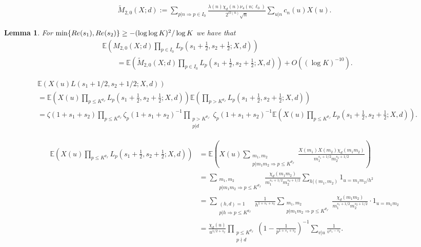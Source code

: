 \documentclass[10pt,a4paper]{amsart}
\newtheorem{lemma}{Lemma}
\renewcommand{\Re}{\textnormal{Re}}
\begin{document}
\begin{align}\label{modified-zero}
\widetilde M_{2,0}(X;d):=\sum_{p|n\Rightarrow p\in I_0}\frac{\lambda(n)\chi_d(n)\nu_4(n;\ell_0)}{2^{\Omega(n)}\sqrt n}\sum_{u|n}c_n(u)X(u).
\end{align}

\begin{lemma}\label{small-primes}
For $\min\{\Re(s_1),\Re(s_2)\}\geq -(\log\log K)^2/\log K$ we have that 
\begin{align*}
&\mathbb E\left(M_{2,0}(X;d)\prod_{p\in I_0}L_p\left(s_1+\frac12,s_2+\frac12;X,d\right)\right)\\
&\qquad=\mathbb E\left(\widetilde M_{2,0}(X;d)\prod_{p\in I_0}L_p\left(s_1+\frac12,s_2+\frac12;X,d\right)\right)+O\left((\log K)^{-10}\right).
\end{align*}
\end{lemma}

\begin{align}\label{twisted-exp}
&\mathbb E\left(X(u)L(s_1+1/2,s_2+1/2;X,d)\right) \nonumber\\
&=\mathbb E\left(X(u)\prod_{p\leq K^{\theta_J}}L_p\left(s_1+\frac12,s_2+\frac12;X,d\right)\right)\mathbb E\left(\prod_{p>K^{\theta_J}}L_p\left(s_1+\frac12,s_2+\frac12;X,d\right)\right)\nonumber\\
&=\zeta(1+s_1+s_2)\prod_{p\leq K^{\theta_J}}\zeta_p(1+s_1+s_2)^{-1}\prod_{\substack{p>K^{\theta_J}\\
p|d}}\zeta_p(1+s_1+s_2)^{-1}\mathbb E\left(X(u)\prod_{p\leq K^{\theta_J}}L_p\left(s_1+\frac12,s_2+\frac12;X,d\right)\right).
\end{align} 

\begin{align}\label{twisted-exp-small}
\mathbb E\left(X(u)\prod_{p\leq K^{\theta_J}}L_p\left(s_1+\frac12,s_2+\frac12;X,d\right)\right)&=\mathbb E\left(X(u)\sum_{\substack{m_1,m_2\\
p|m_1m_2\Rightarrow p\leq K^{\theta_J}}}\frac{X(m_1)X(m_2)\chi_d(m_1m_2)}{m_1^{s_1+1/2}m_2^{s_2+1/2}}\right) \nonumber\\
&=\sum_{\substack{m_1,m_2\\
p|m_1m_2\Rightarrow p\leq K^{\theta_J}}}\frac{\chi_d(m_1m_2)}{m_1^{s_1+1/2}m_2^{s_2+1/2}}\sum_{h|(m_1,m_2)}1_{u=m_1m_2/h^2} \nonumber\\
&=\sum_{\substack{(h,d)=1\\
p|h\Rightarrow p\leq K^{\theta_J}}}\frac1{h^{1+s_1+s_2}}\sum_{\substack{m_1,m_2\\
p|m_1m_2\Rightarrow p\leq K^{\theta_J}}}\frac{\chi_d(m_1m_2)}{m_1^{s_1+1/2}m_2^{s_2+1/2}}\cdot 1_{u=m_1m_2} \nonumber\\
&=\frac{\chi_d(u)}{u^{1/2+s_2}}\prod_{\substack{p\leq K^{\theta_J}\\
p\nmid d}}\left(1-\frac1{p^{1+s_1+s_2}}\right)^{-1}\sum_{v|u}\frac1{v^{s_1-s_2}}.
\end{align}
\end{document}
